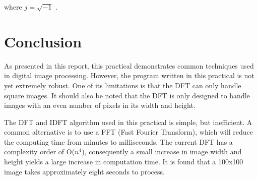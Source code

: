 \documentclass[a4paper,12pt]{article}
\numberwithin{equation}{section} %
\numberwithin{figure}{section}
\begin{document}
where $ j = \sqrt{-1} $  \cite{pratt2001digital}.

\pagebreak

\section{Conclusion}
As presented in this report, this practical demonstrates common techniques used in digital image processing. However, the program written in this practical is not yet extremely robust. One of its limitations is that the DFT can only handle square images. It should also be noted that the DFT is only designed to handle images with an even number of pixels in its width and height.

The DFT and IDFT algorithm used in this practical is simple, but inefficient. A common alternative is to use a FFT (Fast Fourier Transform), which will reduce the computing time from minutes to milliseconds. The current DFT has a complexity order of O($n^4$), consequently a small increase in image width and height yields a large increase in computation time. It is found that a 100x100 image takes approximately eight seconds to process.



{
 \nocite{*} %
 
}
\end{document}
